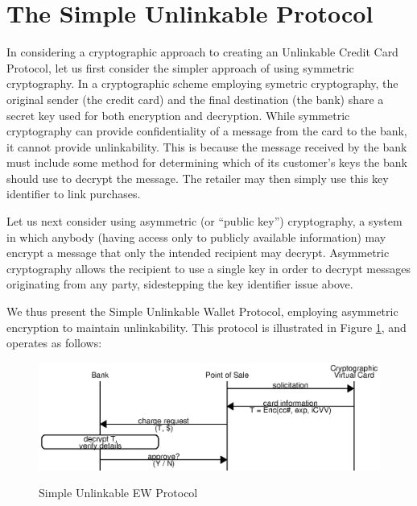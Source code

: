 \section{The Simple Unlinkable Protocol}
\label{sec:unlinkable-simple}

In considering a cryptographic approach to creating an Unlinkable Credit Card Protocol, let us first consider the simpler approach of using symmetric cryptography.
In a cryptographic scheme employing symetric cryptography,
    the original sender (the credit card) and the final destination (the bank) share a secret key used for both encryption and decryption.
While symmetric cryptography can provide confidentiality of a message from the card to the bank, it cannot provide unlinkability.
This is because the message received by the bank must include some method for determining which of its customer's keys the bank should use to decrypt the message.
The retailer may then simply use this key identifier to link purchases.

Let us next consider using asymmetric (or ``public key'') cryptography,
  a system in which anybody (having access only to publicly available information) may encrypt a message that only the intended recipient may decrypt.
Asymmetric cryptography allows the recipient to use a single key in order to decrypt messages originating from any party, sidestepping the key identifier issue above.

We thus present the Simple Unlinkable Wallet Protocol, employing asymmetric encryption to maintain unlinkability.
This protocol is illustrated in Figure \ref{fig:simple-cpp}, and operates as follows:

\begin{figure}[h]
  \caption{Simple Unlinkable EW Protocol}
  \centering
    \includegraphics{img/simple-unlinkable-cpp.eps}
  \label{fig:simple-cpp}
\end{figure}

